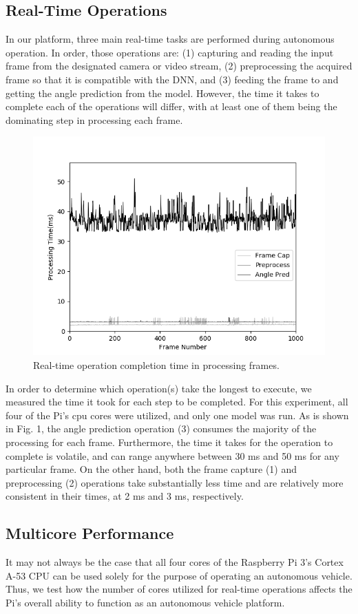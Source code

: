 \documentclass[10pt, conference]{IEEEtran}
\begin{document}
\subsection{Real-Time Operations}
In our platform, three main real-time tasks are performed during autonomous operation. 
In order, those operations are: (1) capturing and reading the input frame from the designated camera 
or video stream, (2) preprocessing the acquired frame so that it is compatible with the DNN, and (3) 
feeding the frame to and getting the angle prediction from the model. However, the time it takes to 
complete each of the operations will differ, with at least one of them being the dominating step in 
processing each frame.

\begin{figure}[h]
  \centering
  \includegraphics[width=.5\textwidth]{Operation_Time}
  \caption{ Real-time operation completion time in processing frames.}
\end{figure}

In order to determine which operation(s) take the longest to execute, we measured the time it 
took for each step to be completed. For this experiment, all four of the Pi's cpu cores were utilized, 
and only one model was run. As is shown in Fig. 1, the angle prediction operation (3) consumes the 
majority of the processing for each frame. Furthermore, the time it takes for the operation to 
complete is volatile, and can range anywhere between 30 ms and 50 ms for any particular frame. On the 
other hand, both the frame capture (1) and preprocessing (2) operations take substantially less time 
and are relatively more consistent in their times, at 2 ms and 3 ms, respectively. 

\subsection{Multicore Performance}
It may not always be the case that all four cores of the Raspberry Pi 3's Cortex A-53 CPU can be used 
solely for the purpose of operating an autonomous vehicle. Thus, we test how the number of cores 
utilized for real-time operations affects the Pi's overall ability to function as an autonomous 
vehicle platform.
\end{document}
